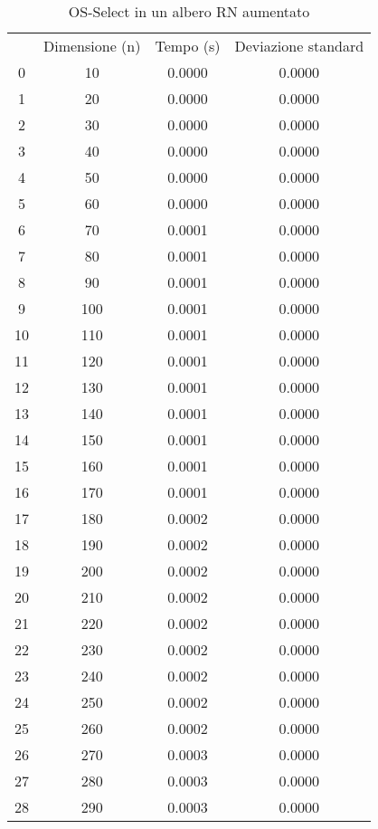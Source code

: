 \begin{table}[H]
\centering
\caption{OS-Select in un albero RN aumentato}
\label{OS-Select in un albero RN aumentato}
\begin{tabular}{cccc}
 & Dimensione (n) & Tempo (s) & Deviazione standard \\
0 & 10 & 0.0000 & 0.0000 \\
\cline{1-4}
1 & 20 & 0.0000 & 0.0000 \\
\cline{1-4}
2 & 30 & 0.0000 & 0.0000 \\
\cline{1-4}
3 & 40 & 0.0000 & 0.0000 \\
\cline{1-4}
4 & 50 & 0.0000 & 0.0000 \\
\cline{1-4}
5 & 60 & 0.0000 & 0.0000 \\
\cline{1-4}
6 & 70 & 0.0001 & 0.0000 \\
\cline{1-4}
7 & 80 & 0.0001 & 0.0000 \\
\cline{1-4}
8 & 90 & 0.0001 & 0.0000 \\
\cline{1-4}
9 & 100 & 0.0001 & 0.0000 \\
\cline{1-4}
10 & 110 & 0.0001 & 0.0000 \\
\cline{1-4}
11 & 120 & 0.0001 & 0.0000 \\
\cline{1-4}
12 & 130 & 0.0001 & 0.0000 \\
\cline{1-4}
13 & 140 & 0.0001 & 0.0000 \\
\cline{1-4}
14 & 150 & 0.0001 & 0.0000 \\
\cline{1-4}
15 & 160 & 0.0001 & 0.0000 \\
\cline{1-4}
16 & 170 & 0.0001 & 0.0000 \\
\cline{1-4}
17 & 180 & 0.0002 & 0.0000 \\
\cline{1-4}
18 & 190 & 0.0002 & 0.0000 \\
\cline{1-4}
19 & 200 & 0.0002 & 0.0000 \\
\cline{1-4}
20 & 210 & 0.0002 & 0.0000 \\
\cline{1-4}
21 & 220 & 0.0002 & 0.0000 \\
\cline{1-4}
22 & 230 & 0.0002 & 0.0000 \\
\cline{1-4}
23 & 240 & 0.0002 & 0.0000 \\
\cline{1-4}
24 & 250 & 0.0002 & 0.0000 \\
\cline{1-4}
25 & 260 & 0.0002 & 0.0000 \\
\cline{1-4}
26 & 270 & 0.0003 & 0.0000 \\
\cline{1-4}
27 & 280 & 0.0003 & 0.0000 \\
\cline{1-4}
28 & 290 & 0.0003 & 0.0000 \\

\end{tabular}
\end{table}
